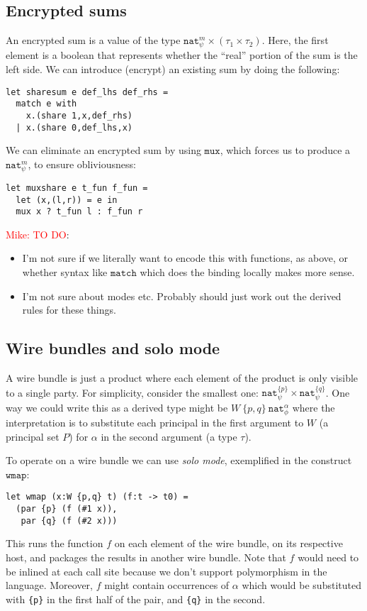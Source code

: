 \documentclass[10pt]{article}
\newcommand{\kw}[1]{\ensuremath{\mathtt{#1}}}
\newcommand{\tnat}{\ensuremath{\mathtt{nat}}}
\newcommand{\tprod}[2]{\ensuremath{{#1} \times {#2}}}
\newcommand{\mwh}[1]{\textcolor{red}{Mike: #1}}
\begin{document}
\subsection{Encrypted sums}

An encrypted sum is a value of the type
$\tprod{\tnat^m_\psi}{(\tprod{\tau_1}{\tau_2})}$. Here, the first
element is a boolean that represents whether the ``real'' portion of
the sum is the left side. We can introduce (encrypt) an existing sum
by doing the following:
\begin{verbatim}
let sharesum e def_lhs def_rhs =
  match e with
    x.(share 1,x,def_rhs)
  | x.(share 0,def_lhs,x)
\end{verbatim}
We can eliminate an encrypted sum by using $\kw{mux}$, which forces us
to produce a $\tnat^m_\psi$, to ensure obliviousness:
\begin{verbatim}
let muxshare e t_fun f_fun =
  let (x,(l,r)) = e in
  mux x ? t_fun l : f_fun r
\end{verbatim}

\mwh{TO DO}:
\begin{itemize}
\item I'm not sure if we literally want to encode this with functions,
  as above, or whether syntax like $\kw{match}$ which does the binding
  locally makes more sense.
\item I'm not sure about modes etc. Probably should just work out the
  derived rules for these things.
\end{itemize}
  
\subsection{Wire bundles and solo mode}

A wire bundle is just a product where each element of the product is
only visible to a single party. For simplicity, consider the smallest
one: $\tprod{\tnat^{\{p\}}_\psi}{\tnat^{\{q\}}_\psi}$. One way we
could write this as a derived type might be
$W~\{p,q\}~\tnat^\alpha_\phi$ where the interpretation is to
substitute each principal in the first argument to $W$ (a principal
set $P$) for $\alpha$ in the second argument (a type $\tau$).

To operate on a wire bundle we can use \emph{solo mode}, exemplified
in the construct $\kw{wmap}$:
\begin{verbatim}
let wmap (x:W {p,q} t) (f:t -> t0) =
  (par {p} (f (#1 x)), 
   par {q} (f (#2 x)))
\end{verbatim}
This runs the function $f$ on each element of the wire bundle, on its
respective host, and packages the results in another wire bundle. Note
that $f$ would need to be inlined at each call site because we don't
support polymorphism in the language. Moreover, $f$ might contain
occurrences of $\alpha$ which would  be substituted with
\texttt{\{p\}} in the first half of the pair, and \texttt{\{q\}} in
the second.
\end{document}
